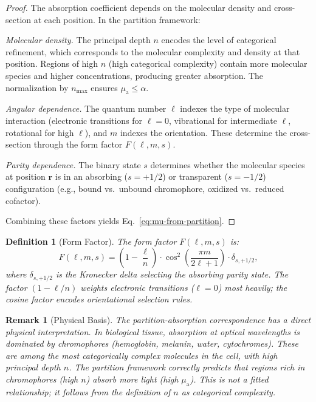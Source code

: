 \documentclass[11pt,twocolumn,a4paper]{article}
\newtheorem{definition}[theorem]{Definition}
\newtheorem{remark}[theorem]{Remark}
\newcommand{\muabs}{\mu_{\mathrm{a}}}
\begin{document}
\begin{proof}
The absorption coefficient depends on the molecular density and
cross-section at each position. In the partition framework:

\textit{Molecular density.} The principal depth $n$ encodes the
level of categorical refinement, which corresponds to the molecular
complexity and density at that position. Regions of high $n$ (high
categorical complexity) contain more molecular species and higher
concentrations, producing greater absorption. The normalization by
$n_{\max}$ ensures $\muabs \leq \alpha$.

\textit{Angular dependence.} The quantum number $\ell$ indexes
the type of molecular interaction (electronic transitions for
$\ell = 0$, vibrational for intermediate $\ell$, rotational for
high $\ell$), and $m$ indexes the orientation. These determine the
cross-section through the form factor $F(\ell, m, s)$.

\textit{Parity dependence.} The binary state $s$ determines whether
the molecular species at position $\mathbf{r}$ is in an
absorbing ($s = +1/2$) or transparent ($s = -1/2$) configuration
(e.g., bound vs.\ unbound chromophore, oxidized vs.\ reduced
cofactor).

Combining these factors yields
Eq.~\eqref{eq:mu-from-partition}.
\end{proof}

\begin{definition}[Form Factor]
\label{def:form-factor}
The form factor $F(\ell, m, s)$ is:
\begin{equation}
F(\ell, m, s) = \left(1 - \frac{\ell}{n}\right)
  \cdot \cos^2\!\left(\frac{\pi m}{2\ell+1}\right)
  \cdot \delta_{s,+1/2},
\label{eq:form-factor}
\end{equation}
where $\delta_{s,+1/2}$ is the Kronecker delta selecting the absorbing
parity state. The factor $(1 - \ell/n)$ weights electronic transitions
($\ell = 0$) most heavily; the cosine factor encodes orientational
selection rules.
\end{definition}


\begin{remark}[Physical Basis]
The partition-absorption correspondence has a direct physical
interpretation. In biological tissue, absorption at optical
wavelengths is dominated by chromophores (hemoglobin, melanin,
water, cytochromes). These are among the most categorically complex
molecules in the cell, with high principal depth $n$. The partition
framework correctly predicts that regions rich in chromophores (high
$n$) absorb more light (high $\muabs$). This is not a fitted
relationship; it follows from the definition of $n$ as categorical
complexity.
\end{remark}
\end{document}
